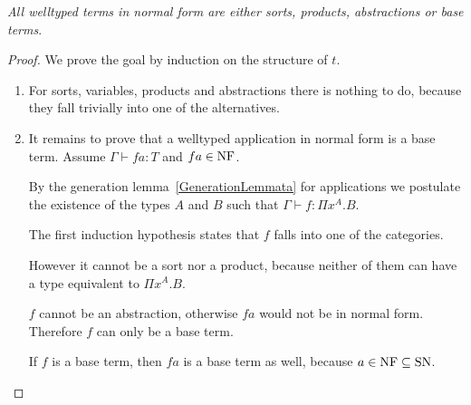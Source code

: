 \begin{theorem}
    \label{NormalWelltypedTerms}
    \emph{All welltyped terms in normal form are either sorts, products,
    abstractions or base terms}.
    \begin{proof}
        We prove the goal by induction on the structure of $t$.

        \begin{enumerate}
            \item For sorts, variables, products and abstractions there is
                nothing to do, because they fall trivially into one of the
                alternatives.

            \item It remains to prove that a welltyped application in normal
                form is a base term. Assume $\Gamma \vdash fa : T$ and $fa \in
                \text{NF}$.

                By the generation lemma~\ref{GenerationLemmata} for applications
                we postulate the existence of the types $A$ and $B$ such that
                $\Gamma \vdash f: \Pi x^A. B$.

                The first induction hypothesis states that $f$ falls into one of
                the categories.

                However it cannot be a sort nor a product,
                because neither of them can have a type equivalent to $\Pi
                x^A.B$.

                $f$ cannot be an abstraction, otherwise $fa$ would not
                be in normal form. Therefore $f$ can only be a base term.

                If $f$ is a base term, then $fa$ is a base term as well, because
                $a\in\text{NF} \subseteq \text{SN}$.
        \end{enumerate}
    \end{proof}
\end{theorem}



